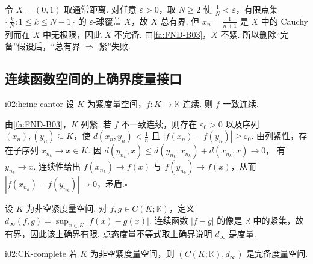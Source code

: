 \begin{FACounterexample}[删除完备性后的失败]
令 \(\displaystyle X=(0,1)\) 取通常距离. 对任意 \(\displaystyle \varepsilon>0\)，取 \(\displaystyle N\geqslant2\) 使 \(\displaystyle \frac{1}{N}<\varepsilon\)，有限点集 \(\displaystyle \{\frac{k}{N}:1\leqslant k\leqslant N-1\}\) 的 \(\displaystyle \varepsilon\)-球覆盖 \(\displaystyle X\)，故 \(\displaystyle X\) 总有界. 但 \(\displaystyle x_n=\frac{1}{n+1}\) 是 \(\displaystyle X\) 中的 Cauchy 列而在 \(\displaystyle X\) 中无极限，因此 \(\displaystyle X\) 不完备. 由\autoref{fa:FND-B03}，\(\displaystyle X\) 不紧. 所以删除“完备”假设后，“总有界 \(\displaystyle \Rightarrow\) 紧”失败.
\end{FACounterexample}

\subsection{连续函数空间的上确界度量接口}

\begin{FALemma}{i02:heine-cantor}
设 \(\displaystyle K\) 为紧度量空间，\(\displaystyle f:K\to\mathbb K\) 连续. 则 \(\displaystyle f\) 一致连续.
\end{FALemma}

\begin{FAProof}
由\autoref{fa:FND-B03}，\(\displaystyle K\) 列紧. 若 \(\displaystyle f\) 不一致连续，则存在 \(\displaystyle \varepsilon_0>0\) 以及序列 \(\displaystyle (x_n),(y_n)\subseteq K\)，使 \(\displaystyle d(x_n,y_n)<\frac{1}{n}\) 且 \(\displaystyle |f(x_n)-f(y_n)|\geqslant\varepsilon_0\). 由列紧性，存在子序列 \(\displaystyle x_{n_k}\to x\in K\). 因 \(\displaystyle d(y_{n_k},x)\leqslant d(y_{n_k},x_{n_k})+d(x_{n_k},x)\longrightarrow0\)，
有 \(\displaystyle y_{n_k}\to x\). 连续性给出 \(\displaystyle f(x_{n_k})\to f(x)\) 与 \(\displaystyle f(y_{n_k})\to f(x)\)，从而 \(\displaystyle |f(x_{n_k})-f(y_{n_k})|\to0\)，矛盾.\hfill\(\square\)
\end{FAProof}

设 \(\displaystyle K\) 为非空紧度量空间. 对 \(\displaystyle f,g\in C(K;\mathbb K)\)，定义 \(\displaystyle d_\infty(f,g)=\sup_{x\in K}|f(x)-g(x)|\).
连续函数 \(\displaystyle |f-g|\) 的像是 \(\displaystyle \mathbb R\) 中的紧集，故有界，因此该上确界有限. 点态度量不等式取上确界说明 \(\displaystyle d_\infty\) 是度量.

\begin{FALemma}{i02:CK-complete}
若 \(\displaystyle K\) 为非空紧度量空间，则 \(\displaystyle (C(K;\mathbb K),d_\infty)\) 是完备度量空间.
\end{FALemma}


